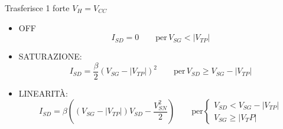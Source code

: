 \documentclass{article}
\begin{document}
\begin{minipage}{0.4\textwidth}
\end{minipage}
\begin{minipage}{0.5\textwidth}
    Trasferisce 1 forte $V_H = V_{CC}$
    \begin{itemize}
        \item OFF
            \[ I_{SD} = 0 \qquad \text{per}\, V_{SG} < |V_{TP}| \]
        \item SATURAZIONE:
            \[ I_{SD} = \frac{\beta}{2}(V_{SG} - |V_{TP}|) ^2 \qquad \text{per}\,V_{SD} \ge V_{SG} - |V_{TP}| \]
        \item LINEARITÀ:
            \[
                I_{SD} = \beta\left((V_{SG} - |V_{TP}|)V_{SD} - \frac{V_{SN}^2}{2}\right)
                \qquad\text{per}
                \begin{cases}
                    V_{SD} < V_{SG} - |V_{TP}|\\
                V_{SG} \ge |V_TP|
                \end{cases}
            \]
    \end{itemize}
\end{minipage}
\end{document}
